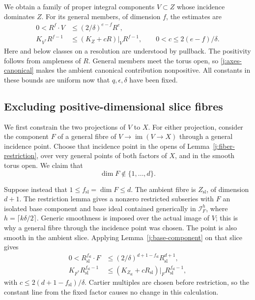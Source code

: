 \documentclass[12pt,a4paper,psamsfonts]{amsart}
\theoremstyle{definition}
\theoremstyle{plain}
\begin{document}
We obtain a family of proper integral components $V\subset Z$ whose
incidence dominates $Z$. For its general members, of dimension $f$,
the estimates are
\begin{equation}\label{j:total-component-bounds}
 \begin{split}
 0<R^f\cdot V&\le(2/\delta)^{e-f}R^e,\\
 K_{V^*}R^{f-1}&\le(K_Z+cR)|_V R^{f-1},
 \qquad 0<c\le2(e-f)/\delta.
 \end{split}
\end{equation}
Here and below classes on a resolution are understood by pullback.
The positivity follows from ampleness of $R$. General members meet
the torus open, so \eqref{j:axes-canonical} makes the ambient
canonical contribution nonpositive. All constants in these bounds
are uniform now that $q,\epsilon,\delta$ have been fixed.

\subsection{Excluding positive-dimensional slice fibres}

We first constrain the two projections of $V$ to $X$. For either
projection, consider the component $F$ of a general fibre of
$V\to\operatorname{im}(V\to X)$ through a general incidence point.
Choose that incidence point in the opens of
Lemma~\ref{j:fiber-restriction}, over very general points of both
factors of $X$, and in the smooth torus open. We claim that
\begin{equation}\label{j:no-intermediate-fibre}
                         \dim F\notin\{1,\ldots,d\}.
\end{equation}

Suppose instead that $1\le f_{\mathrm{sl}}=\dim F\le d$.
The ambient fibre is $Z_{\mathrm{sl}}$, of dimension $d+1$.
The restriction lemma gives a nonzero restricted subseries with
$F$ an isolated base component and base ideal contained generically
in $\mathcal I_F^h$, where $h=\lceil k\delta/2\rceil$.
Generic smoothness is imposed over the actual image of $V$; this is
why a general fibre through the incidence point was chosen.
The point is also smooth in the ambient slice. Applying
Lemma~\ref{j:base-component} on that slice gives
\begin{equation}\label{j:slice-bounds}
 \begin{split}
 0<R_{\mathrm{sl}}^{f_{\mathrm{sl}}}\cdot F
   &\le(2/\delta)^{d+1-f_{\mathrm{sl}}}
                      R_{\mathrm{sl}}^{d+1},\\
 K_{F^*}R_{\mathrm{sl}}^{f_{\mathrm{sl}}-1}
   &\le(K_{Z_{\mathrm{sl}}}+cR_{\mathrm{sl}})|_F
                      R_{\mathrm{sl}}^{f_{\mathrm{sl}}-1},
 \end{split}
\end{equation}
with $c\le2(d+1-f_{\mathrm{sl}})/\delta$. Cartier multiples are
chosen before restriction, so the constant line from the fixed
factor causes no change in this calculation.
\end{document}
